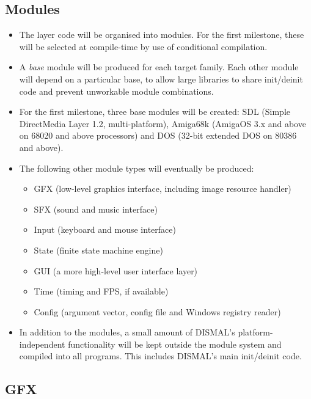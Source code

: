 \documentclass[a4paper]{scrbook}
\begin{document}
\subsection{Modules}

\begin{itemize}
  \item The layer code will be organised into modules. For the first
    milestone, these will be selected at compile-time by use of
    conditional compilation.
  \item A \emph{base} module will be produced for each target
    family. Each other module will depend on a particular base, to
    allow large libraries to share init/deinit code and prevent
    unworkable module combinations.
  \item For the first milestone, three base modules will be created:
    SDL (Simple DirectMedia Layer 1.2, multi-platform), Amiga68k
    (AmigaOS 3.x and above on 68020 and above processors) and DOS
    (32-bit extended DOS on 80386 and above).
  \item The following other module types will eventually be produced:
    \begin{itemize}
      \item GFX (low-level graphics interface, including image
        resource handler)
      \item SFX (sound and music interface)
      \item Input (keyboard and mouse interface)
      \item State (finite state machine engine)
      \item GUI (a more high-level user interface layer)
      \item Time (timing and FPS, if available)
      \item Config (argument vector, config file and Windows registry
        reader)
    \end{itemize}
  \item In addition to the modules, a small amount of DISMAL's
    platform-independent functionality will be kept outside the module
    system and compiled into all programs. This includes DISMAL's main
    init/deinit code.
\end{itemize}

\subsection{GFX}
\end{document}
